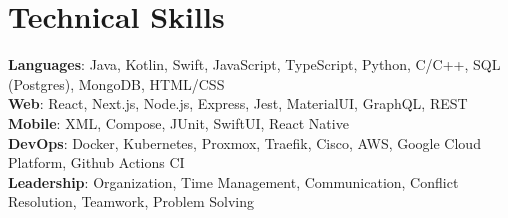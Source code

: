 \documentclass[letterpaper,11pt]{article}
\begin{document}
\section{Technical Skills}
\begin{itemize}[leftmargin=0.15in, label={}]
	\small{\item{
	      \textbf{Languages}{: Java, Kotlin, Swift, JavaScript, TypeScript, Python, C/C++, SQL (Postgres), MongoDB, HTML/CSS} \\
	      \textbf{Web}{: React, Next.js, Node.js, Express, Jest, MaterialUI, GraphQL, REST} \\
	      \textbf{Mobile}{: XML, Compose, JUnit, SwiftUI, React Native} \\
	      \textbf{DevOps}{: Docker, Kubernetes, Proxmox, Traefik, Cisco, AWS, Google Cloud Platform, Github Actions CI} \\
	      \textbf{Leadership}{: Organization, Time Management, Communication, Conflict Resolution, Teamwork, Problem Solving}
	      }}
\end{itemize}

\end{document}
